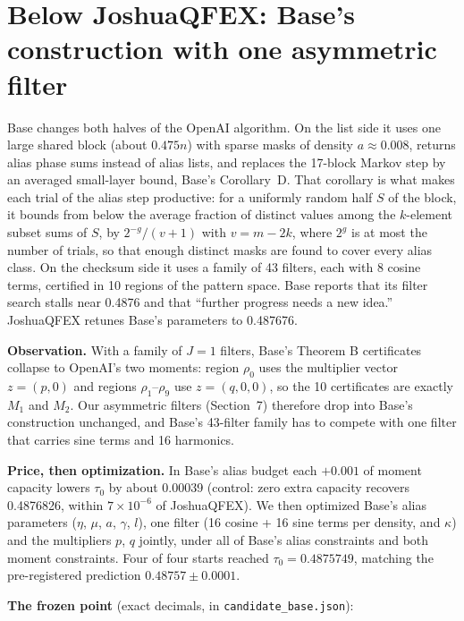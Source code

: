 \documentclass[11pt]{article}
\theoremstyle{plain}
\begin{document}
\section{Below JoshuaQFEX: Base's construction with one asymmetric filter}

Base changes both halves of the OpenAI algorithm. On the list side it uses one large shared block (about $0.475n$) with sparse masks of density $a \approx 0.008$, returns alias phase sums instead of alias lists, and replaces the 17-block Markov step by an averaged small-layer bound, Base's Corollary~D. That corollary is what makes each trial of the alias step productive: for a uniformly random half $S$ of the block, it bounds from below the average fraction of distinct values among the $k$-element subset sums of $S$, by $2^{-g}/(v+1)$ with $v = m - 2k$, where $2^{g}$ is at most the number of trials, so that enough distinct masks are found to cover every alias class. On the checksum side it uses a family of 43 filters, each with 8 cosine terms, certified in 10 regions of the pattern space. Base reports that its filter search stalls near 0.4876 and that ``further progress needs a new idea.'' JoshuaQFEX retunes Base's parameters to 0.487676.

\textbf{Observation.} With a family of $J = 1$ filters, Base's Theorem B certificates collapse to OpenAI's two moments: region $\rho_0$ uses the multiplier vector $z = (p, 0)$ and regions $\rho_1$--$\rho_9$ use $z = (q, 0, 0)$, so the 10 certificates are exactly $M_1$ and $M_2$. Our asymmetric filters (Section~7) therefore drop into Base's construction unchanged, and Base's 43-filter family has to compete with one filter that carries sine terms and 16 harmonics.

\textbf{Price, then optimization.} In Base's alias budget each $+0.001$ of moment capacity lowers $\tau_0$ by about 0.00039 (control: zero extra capacity recovers 0.4876826, within $7\times10^{-6}$ of JoshuaQFEX). We then optimized Base's alias parameters ($\eta$, $\mu$, $a$, $\gamma$, $l$), one filter (16 cosine + 16 sine terms per density, and $\kappa$) and the multipliers $p$, $q$ jointly, under all of Base's alias constraints and both moment constraints. Four of four starts reached $\tau_0 = 0.4875749$, matching the pre-registered prediction $0.48757 \pm 0.0001$.

\textbf{The frozen point} (exact decimals, in \texttt{candidate\_base.json}):
\end{document}
